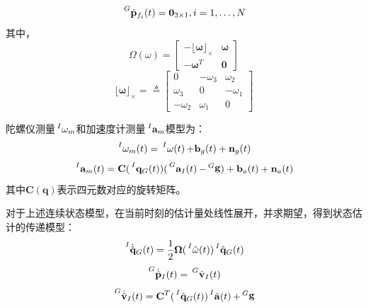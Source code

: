 \documentclass{article}
\begin{document}
\begin{equation}
    \sideset{^G}{}{\mathop{\dot{\mathbf{p}}_{f_i}(t)}}=\textbf{0}_{3\times 1},i=1,\dots,N
\end{equation}
其中，
\begin{equation}
    \Omega(\omega)=\left[\begin{array}{cc}
        -\lfloor{\mathbf{\omega}}\rfloor_{\times} &\mathbf{\omega}\\
        -\mathbf{\omega}^T &\textbf{0}
    \end{array}\right]
\end{equation}
\begin{equation}
    \lfloor{\mathbf{\omega}}\rfloor_{\times}=\triangleq 
    \left[\begin{array}{ccc}
        0 &-\omega_3 &\omega_2\\
        \omega_3 &0 &-\omega_1\\
        -\omega_2 &\omega_1 &0
    \end{array}\right]
\end{equation}
\par
陀螺仪测量$\sideset{^I}{}{\mathop{\mathbf{\omega}_m}}$和加速度计测量$\sideset{^I}{}{\mathop{\mathbf{a}_m}}$模型为：
\begin{equation}
    \sideset{^I}{}{\mathop{\mathbf{\omega}_{m}(t)}}=\sideset{^I}{}{\mathop{\mathbf{\omega}(t)}}
    +\textbf{b}_{g}(t)+\textbf{n}_{g}(t)
\end{equation}
\begin{equation}
    \sideset{^I}{}{\mathop{\mathbf{a}_{m}(t)}}=\textbf{C}(\sideset{^I}{}{\mathop{\mathbf{q}_{G}(t)}})
    (\sideset{^G}{}{\mathop{\mathbf{a}_{I}(t)}}-\sideset{^G}{}{\mathop{\mathbf{g}}})
    +\textbf{b}_{a}(t)+\textbf{n}_{a}(t)
\end{equation}
其中$\textbf{C}(\mathbf{q})$表示四元数对应的旋转矩阵。
\par
对于上述连续状态模型，在当前时刻的估计量处线性展开，并求期望，得到状态估计的传递模型：
\begin{equation}\label{eqs:sysmodel21}
    \sideset{^I}{}{\mathop{\dot{\hat{\mathbf{q}}}_{G}(t)}}=\frac{1}{2}\mathbf{\Omega}(\sideset{^I}{}{\mathop{\hat{\omega}(t)}})\sideset{^I}{}{\mathop{\hat{\mathbf{q}}_{G}(t)}}
\end{equation}
\begin{equation}\label{eqs:sysmodel22}
    \sideset{^G}{}{\mathop{\dot{\hat{\mathbf{p}}}_{I}(t)}}=\sideset{^G}{}{\mathop{\hat{\mathbf{v}}_{I}(t)}}
\end{equation}
\begin{equation}\label{eqs:sysmodel23}
    \sideset{^G}{}{\mathop{\dot{\hat{\mathbf{v}}}_{I}(t)}}=\textbf{C}^{T}(\sideset{^I}{}{\mathop{\hat{\mathbf{q}}_{G}(t)}})
    \sideset{^I}{}{\mathop{\hat{\mathbf{a}}(t)}}+\sideset{^G}{}{\mathop{\mathbf{g}}}
\end{equation}
\end{document}
